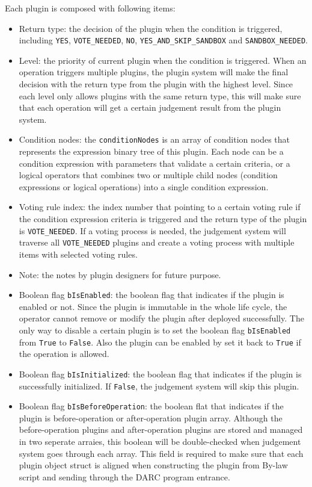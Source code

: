 \documentclass[main.tex]{subfiles}
\begin{document}
Each plugin is composed with following items:
\begin{itemize}
\item Return type: the decision of the plugin when the condition is triggered, including \texttt{YES}, \texttt{VOTE\_NEEDED}, \texttt{NO}, \texttt{YES\_AND\_SKIP\_SANDBOX} and \texttt{SANDBOX\_NEEDED}.
\item Level: the priority of current plugin when the condition is triggered. When an operation triggers multiple plugins, the plugin system will make the final decision with the return type from the plugin with the highest level. Since each level only allows plugins with the same return type, this will make sure that each operation will get a certain judgement result from the plugin system.
\item Condition nodes: the \texttt{conditionNodes} is an array of condition nodes that represents the expression binary tree of this plugin. Each node can be a condition expression with parameters that validate a certain criteria, or a logical operators that combines two or multiple child nodes (condition expressions or logical operations) into a single condition expression. 
\item Voting rule index: the index number that pointing to a certain voting rule if the condition expression criteria is triggered and the return type of the plugin is \texttt{VOTE\_NEEDED}. If a voting process is needed, the judgement system will traverse all \texttt{VOTE\_NEEDED} plugins and create a voting process with multiple items with selected voting rules.
\item Note: the notes by plugin designers for future purpose.
\item Boolean flag \texttt{bIsEnabled}: the boolean flag that indicates if the plugin is enabled or not. Since the plugin is immutable in the whole life cycle, the operator cannot remove or modify the plugin after deployed successfully. The only way to disable a certain plugin is to set the boolean flag \texttt{bIsEnabled} from \texttt{True} to \texttt{False}. Also the plugin can be enabled by set it back to \texttt{True} if the operation is allowed.
\item Boolean flag \texttt{bIsInitialized}: the boolean flag that indicates if the plugin is successfully initialized. If \texttt{False}, the judgement system will skip this plugin.
\item Boolean flag \texttt{bIsBeforeOperation}: the boolean flat that indicates if the plugin is before-operation or after-operation plugin array. Although the before-operation plugins and after-operation plugins are stored and managed in two seperate arraies, this boolean will be double-checked when judgement system goes through each array. This field is required to make sure that each plugin object struct is aligned when constructing the plugin from By-law script and sending through the DARC program entrance.

\end{itemize}
\end{document}
